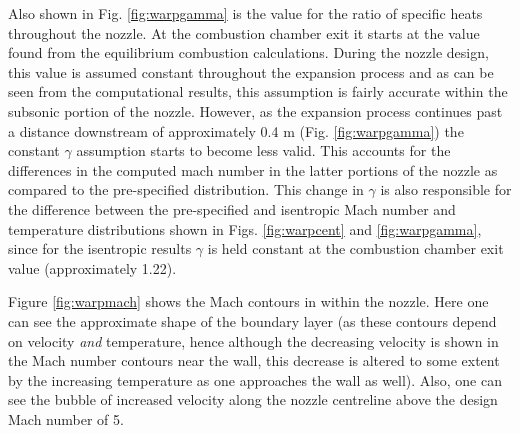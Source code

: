 	Also shown in Fig. \ref{fig:warpgamma} is the value for the ratio of specific heats throughout
the nozzle.  At the combustion chamber exit it starts at the value found from the equilibrium combustion 
calculations.  During the nozzle design, this value is assumed constant throughout the expansion process and
as can be seen from the computational results, this assumption is fairly accurate within the subsonic
portion of the nozzle.  However, as the expansion process continues past 
a distance downstream of approximately 0.4 m (Fig. \ref{fig:warpgamma})
the constant $\gamma$ assumption starts to become less valid.  This accounts for the differences in the
computed mach number in the latter portions of the nozzle as compared to the pre-specified distribution.
This change in $\gamma$ is also responsible for the difference between the pre-specified and isentropic Mach
number and temperature distributions shown in Figs. \ref{fig:warpcent} and \ref{fig:warpgamma}, since for the isentropic results $\gamma$ is held
constant at the combustion chamber exit value (approximately 1.22).

	Figure \ref{fig:warpmach} shows the Mach contours in within the nozzle.  Here one can see the
approximate shape of the boundary layer (as these contours depend on velocity \emph{and} temperature, hence
although the decreasing velocity is shown in the Mach number contours near the wall, this decrease is altered
to some extent by the increasing temperature as one approaches the wall as well).  Also, one can see the 
bubble of increased velocity along the nozzle centreline above the design Mach number of 5.  




